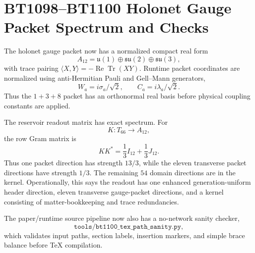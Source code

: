 \section{BT1098--BT1100 Holonet Gauge Packet Spectrum and Checks}
\label{sec:bt1098-bt1100-holonet-realform-spectrum-ci}

The holonet gauge packet now has a normalized compact real form
\[
A_{12}=\mathfrak u(1)\oplus\mathfrak{su}(2)\oplus\mathfrak{su}(3),
\]
with trace pairing $\langle X,Y\rangle=-\operatorname{Re}\operatorname{Tr}(XY)$.  Runtime packet coordinates are normalized using anti-Hermitian Pauli and Gell--Mann generators,
\[
W_a=i\sigma_a/\sqrt2,
\qquad
C_a=i\lambda_a/\sqrt2.
\]
Thus the $1+3+8$ packet has an orthonormal real basis before physical coupling constants are applied.

The reservoir readout matrix has exact spectrum.  For
\[
K:T_{66}\to A_{12},
\]
the row Gram matrix is
\[
KK^*=\frac13 I_{12}+\frac13 J_{12}.
\]
Thus one packet direction has strength $13/3$, while the eleven transverse packet directions have strength $1/3$.  The remaining $54$ domain directions are in the kernel.  Operationally, this says the readout has one enhanced generation-uniform header direction, eleven transverse gauge-packet directions, and a kernel consisting of matter-bookkeeping and trace redundancies.

The paper/runtime source pipeline now also has a no-network sanity checker,
\[
\texttt{tools/bt1100\_tex\_path\_sanity.py},
\]
which validates input paths, section labels, insertion markers, and simple brace balance before TeX compilation.
